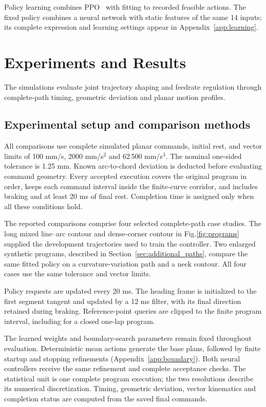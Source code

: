 \documentclass[pdflatex,sn-apa]{sn-jnl}
\begin{document}
Policy learning combines PPO~\citep{Schulman2017PPO} with fitting to recorded feasible actions. The fixed policy combines a neural network with static features of the same 14 inputs; its complete expression and learning settings appear in Appendix~\ref{app:learning}.

\section{Experiments and Results}
\label{sec:experiments}
The simulations evaluate joint trajectory shaping and feedrate regulation through complete-path timing, geometric deviation and planar motion profiles.

\subsection{Experimental setup and comparison methods}
All comparisons use complete simulated planar commands, initial rest, and vector limits of 100 mm/s, 2000 mm/s$^2$ and 62\,500 mm/s$^3$. The nominal one-sided tolerance is 1.25 mm. Known arc-to-chord deviation is deducted before evaluating command geometry. Every accepted execution covers the original program in order, keeps each command interval inside the finite-curve corridor, and includes braking and at least 20 ms of final rest. Completion time is assigned only when all these conditions hold.

The reported comparisons comprise four selected complete-path case studies. The long mixed line--arc contour and dense-corner contour in Fig.\nobreakspace\ref{fig:programs} supplied the development trajectories used to train the controller. Two enlarged synthetic programs, described in Section~\ref{sec:additional_paths}, compare the same fitted policy on a curvature-variation path and a neck contour. All four cases use the same tolerance and vector limits.

Policy requests are updated every 20 ms. The heading frame is initialized to the first segment tangent and updated by a 12 ms filter, with its final direction retained during braking. Reference-point queries are clipped to the finite program interval, including for a closed one-lap program.

The learned weights and boundary-search parameters remain fixed throughout evaluation. Deterministic mean actions generate the base plans, followed by finite startup and stopping refinements (Appendix~\ref{app:boundary}). Both neural controllers receive the same refinement and complete acceptance checks. The statistical unit is one complete program execution; the two resolutions describe its numerical discretization. Timing, geometric deviation, vector kinematics and completion status are computed from the saved final commands.
\end{document}
